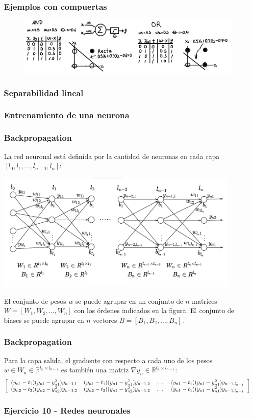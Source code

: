 \begin{frame}\frametitle{Ejemplos con compuertas}
  \begin{figure}
    \centering
    \includegraphics[width=\textwidth]{Figures/NN_AND_OR.png}
  \end{figure}
\end{frame}

\begin{frame}\frametitle{Separabilidad lineal}
\end{frame}

\begin{frame}\frametitle{Entrenamiento de una neurona}
\end{frame}

\begin{frame}\frametitle{Backpropagation}
  La red neuronal está definida por la cantidad de neuronas en cada capa $[l_0, l_1, \dots, l_{n-1}, l_n]$:
  
  \includegraphics[width=0.9\textwidth]{Figures/NeuralNetworks1.pdf}
  
  El conjunto de pesos $w$ se puede agrupar en un conjunto de $n$ matrices $W=[W_1, W_2, \dots , W_n]$ con los órdenes indicados en la figura. El conjunto de biases se puede agrupar en $n$ vectores $B=[B_1, B_2, \dots, B_n]$. 
\end{frame}

\begin{frame}\frametitle{Backpropagation}
  Para la capa salida, el gradiente  con respecto a cada uno de los pesos $w\in W_n\in\mathbb{R}^{l_n\times l_{n-1}}$ es también una matriz $\nabla y_n \in \mathbb{R}^{l_n\times l_{n-1}}$:
  \[\left[\begin{tabular}{cccc}
      $(y_{n1} - t_1)(y_{n1}-y_{n1}^2)y_{n-1,1}$ & $(y_{n1} - t_1)(y_{n1}-y_{n1}^2)y_{n-1,2}$ & \dots & $(y_{n1} - t_1)(y_{n1}-y_{n1}^2)y_{n-1,l_{n-1}}$ \\
      $(y_{n2} - t_2)(y_{n2}-y_{n2}^2)y_{n-1,2}$ & $(y_{n2} - t_2)(y_{n2}-y_{n2}^2)y_{n-1,2}$ & \dots & $(y_{n1} - t_1)(y_{n1}-y_{n1}^2)y_{n-1,l_{n-1}}$ \\
  \end{tabular}\right]\]
\end{frame}

\begin{frame}\frametitle{Ejercicio 10 - Redes neuronales}
\end{frame}